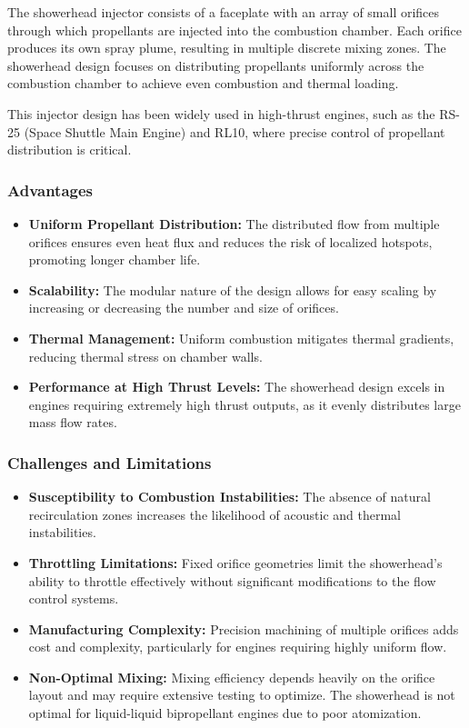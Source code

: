 The showerhead injector consists of a faceplate with an array of small orifices through which propellants are injected into the combustion chamber. Each orifice produces its own spray plume, resulting in multiple discrete mixing zones. The showerhead design focuses on distributing propellants uniformly across the combustion chamber to achieve even combustion and thermal loading.

This injector design has been widely used in high-thrust engines, such as the RS-25 (Space Shuttle Main Engine) and RL10, where precise control of propellant distribution is critical.


\subsubsection{Advantages}

\begin{itemize}
    \item \textbf{Uniform Propellant Distribution:} The distributed flow from multiple orifices ensures even heat flux and reduces the risk of localized hotspots, promoting longer chamber life.
    \item \textbf{Scalability:} The modular nature of the design allows for easy scaling by increasing or decreasing the number and size of orifices.
    \item \textbf{Thermal Management:} Uniform combustion mitigates thermal gradients, reducing thermal stress on chamber walls.
    \item \textbf{Performance at High Thrust Levels:} The showerhead design excels in engines requiring extremely high thrust outputs, as it evenly distributes large mass flow rates.
\end{itemize}



\subsubsection{Challenges and Limitations}

\begin{itemize}
    \item \textbf{Susceptibility to Combustion Instabilities:} The absence of natural recirculation zones increases the likelihood of acoustic and thermal instabilities.
    \item \textbf{Throttling Limitations:} Fixed orifice geometries limit the showerhead's ability to throttle effectively without significant modifications to the flow control systems.
    \item \textbf{Manufacturing Complexity:} Precision machining of multiple orifices adds cost and complexity, particularly for engines requiring highly uniform flow.
    \item \textbf{Non-Optimal Mixing:} Mixing efficiency depends heavily on the orifice layout and may require extensive testing to optimize. The showerhead is not optimal for liquid-liquid bipropellant engines due to poor atomization. 
\end{itemize}

